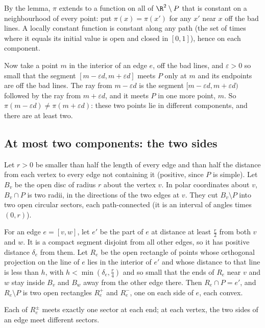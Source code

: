 By the lemma, $\pi$ extends to a function on all of $\R^2\setminus P$ that is constant on a neighbourhood of every point: put $\pi(x)=\pi(x')$ for any $x'$ near $x$ off the bad lines. A locally constant function is constant along
any path (the set of times where it equals its initial value is open and closed in $[0,1]$), hence on each component.

Now take a point $m$ in the interior of an edge $e$, off the bad lines, and $\varepsilon>0$ so small that the segment $[m-\varepsilon d,m+\varepsilon d]$ meets $P$ only at $m$ and its endpoints are off the bad lines. The ray from $m-\varepsilon d$ is the
segment $[m-\varepsilon d,m+\varepsilon d)$ followed by the ray from $m+\varepsilon d$, and it meets $P$ in one more point, $m$. So $\pi(m-\varepsilon d)\ne\pi(m+\varepsilon d)$: these two points lie in different components, and there are at least two.

\subsection*{At most two components: the two sides}

Let $r>0$ be smaller than half the length of every edge and than half the distance from each vertex to every edge not containing it (positive, since $P$ is simple). Let $B_v$ be the open disc of radius $r$ about the vertex $v$.
In polar coordinates about $v$, $B_v\cap P$ is two radii, in the directions of the two edges at $v$. They cut $B_v\setminus P$ into two open circular sectors, each path-connected (it is an interval of angles times $(0,r)$).

For an edge $e=[v,w]$, let $e'$ be the part of $e$ at distance at least $\frac r2$ from both $v$ and $w$. It is a compact segment disjoint from all other edges, so it has positive distance $\delta_e$ from them. Let $R_e$ be the open rectangle of points whose orthogonal projection on the line of $e$ lies in the interior of $e'$ and whose distance to that line is less than $h$, with $h<\min(\delta_e,\frac r4)$ and so small that the ends of $R_e$ near $v$ and $w$ stay inside $B_v$ and $B_w$ away from the other edge there. Then $R_e\cap P=e'$, and $R_e\setminus P$ is two open
rectangles $R_e^+$ and $R_e^-$, one on each side of $e$, each convex.

\begin{lemma}\label{lem:sides}
Each of $R_e^\pm$ meets exactly one sector at each end; at each vertex, the two sides of an edge meet different sectors.
\end{lemma}

